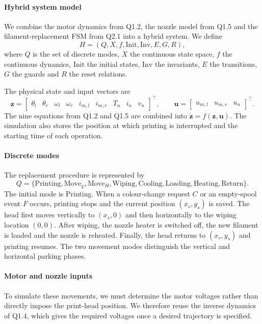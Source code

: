 \documentclass[a4paper,12pt]{article}
\begin{document}
\paragraph{Hybrid system model}
We combine the motor dynamics from Q1.2, the nozzle model from Q1.5 and the filament-replacement FSM from Q2.1 into a hybrid system. We define
\begin{equation}
H=(Q,X,f,\mathrm{Init},\mathrm{Inv},E,G,R),
\end{equation}
where $Q$ is the set of discrete modes, $X$ the continuous state space, $f$ the continuous dynamics, $\mathrm{Init}$ the initial states, $\mathrm{Inv}$ the invariants, $E$ the transitions, $G$ the guards and $R$ the reset relations.

The physical state and input vectors are
\begin{equation}
\mathbf z=\begin{bmatrix}
\theta_l&\theta_r&\omega_l&\omega_r&i_{m,l}&i_{m,r}&T_n&i_n&v_n
\end{bmatrix}^{\top},\qquad
\mathbf u=\begin{bmatrix}u_{m,l}&u_{m,r}&u_n\end{bmatrix}^{\top}.
\end{equation}
The nine equations from Q1.2 and Q1.5 are combined into $\dot{\mathbf z}=f(\mathbf z,\mathbf u)$. The simulation also stores the position at which printing is interrupted and the starting time of each operation.

\paragraph{Discrete modes}
The replacement procedure is represented by
\[
Q=\{\mathrm{Printing,Move}_V,\mathrm{Move}_H,
\mathrm{Wiping,Cooling,Loading,Heating,Return}\}.
\]
The initial mode is Printing. When a colour-change request $C$ or an empty-spool event $F$ occurs, printing stops and the current position $(x_s,y_s)$ is saved. The head first moves vertically to $(x_s,0)$ and then horizontally to the wiping location $(0,0)$. After wiping, the nozzle heater is switched off, the new filament is loaded and the nozzle is reheated. Finally, the head returns to $(x_s,y_s)$ and printing resumes. The two movement modes distinguish the vertical and horizontal parking phases.

\paragraph{Motor and nozzle inputs}
To simulate these movements, we must determine the motor voltages rather than directly impose the print-head position. We therefore reuse the inverse dynamics of Q1.4, which gives the required voltages once a desired trajectory is specified.
\end{document}
